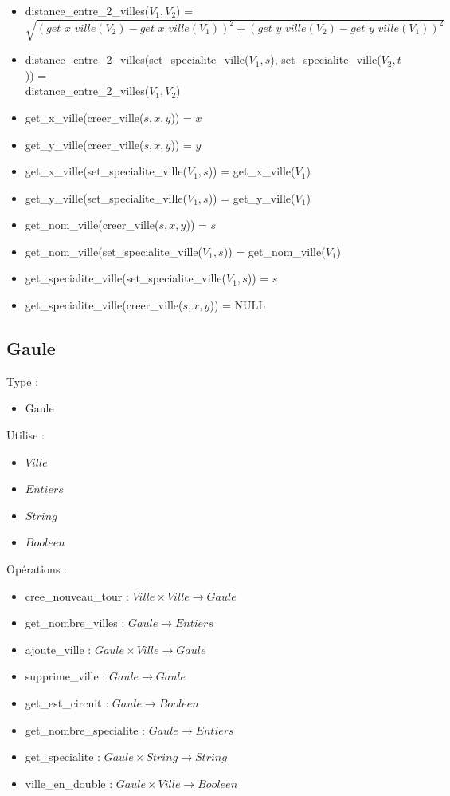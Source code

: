 \documentclass[a4paper, 11pt, oneside]{article}
\begin{document}
\begin{itemize}
    \item distance\_entre\_2\_villes($V_1,V_2$) = 
    \\$\sqrt{(get\_x\_ville(V_2)-get\_x\_ville(V_1))^2+(get\_y\_ville(V_2)-get\_y\_ville(V_1))^2}$
    \item distance\_entre\_2\_villes(set\_specialite\_ville($V_1, s$), set\_specialite\_ville($V_2, t$)) = \\
    distance\_entre\_2\_villes($V_1,V_2$)
    \item get\_x\_ville(creer\_ville($s, x, y$)) = $x$
    \item get\_y\_ville(creer\_ville($s, x, y$)) = $y$
    \item get\_x\_ville(set\_specialite\_ville($V_1, s$)) = get\_x\_ville($V_1$)
    \item get\_y\_ville(set\_specialite\_ville($V_1, s$)) = get\_y\_ville($V_1$)
    \item get\_nom\_ville(creer\_ville($s, x, y$)) = $s$
    \item get\_nom\_ville(set\_specialite\_ville($V_1, s$)) = get\_nom\_ville($V_1$)
    \item get\_specialite\_ville(set\_specialite\_ville($V_1, s$)) = $s$
    \item get\_specialite\_ville(creer\_ville($s, x, y$)) = NULL

\end{itemize}

\subsection{\textbf{Gaule}}
\noindent Type :
\begin{itemize}
    \item Gaule
\end{itemize}

\noindent Utilise :
\begin{itemize}
    \item $Ville$
    \item $Entiers$
    \item $String$
    \item $Booleen$
\end{itemize}

\noindent Opérations :
\begin{itemize}
    \item cree\_nouveau\_tour : $Ville \times Ville \rightarrow Gaule$
    \item get\_nombre\_villes : $Gaule \rightarrow Entiers$
    \item ajoute\_ville : $Gaule \times Ville \rightarrow Gaule$
    \item supprime\_ville : $Gaule \rightarrow Gaule$
    \item get\_est\_circuit : $Gaule \rightarrow Booleen$
    \item get\_nombre\_specialite : $Gaule \rightarrow Entiers$
    \item get\_specialite : $Gaule \times String \rightarrow String$
    \item ville\_en\_double : $Gaule \times Ville \rightarrow Booleen$
\end{itemize}
\end{document}
